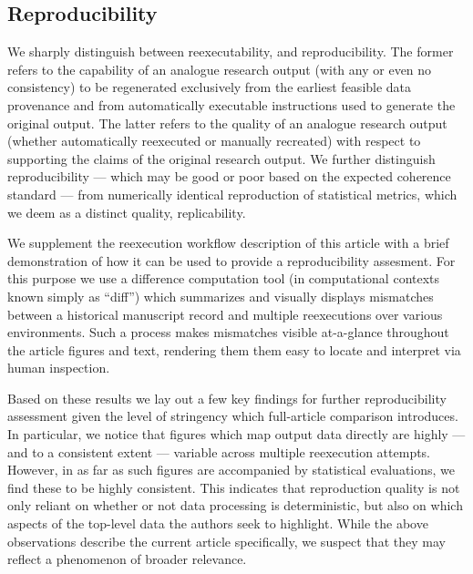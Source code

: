 \subsection{Reproducibility}

We sharply distinguish between reexecutability, and reproducibility.
The former refers to the capability of an analogue research output (with any or even no consistency) to be regenerated exclusively from the earliest feasible data provenance and from automatically executable instructions used to generate the original output.
The latter refers to the quality of an analogue research output (whether automatically reexecuted or manually recreated) with respect to supporting the claims of the original research output.
We further distinguish reproducibility — which may be good or poor based on the expected coherence standard — from numerically identical reproduction of statistical metrics, which we deem as a distinct quality, replicability.

We supplement the reexecution workflow description of this article with a brief demonstration of how it can be used to provide a reproducibility assesment.
For this purpose we use a difference computation tool (in computational contexts known simply as “diff”) which summarizes and visually displays mismatches between a historical manuscript record and multiple reexecutions over various environments.
Such a process makes mismatches visible at-a-glance throughout the article figures and text, rendering them them easy to locate and interpret via human inspection.

Based on these results we lay out a few key findings for further reproducibility assessment given the level of stringency which full-article comparison introduces.
In particular, we notice that figures which map output data directly are highly — and to a consistent extent — variable across multiple reexecution attempts.
However, in as far as such figures are accompanied by statistical evaluations, we find these to be highly consistent.
This indicates that reproduction quality is not only reliant on whether or not data processing is deterministic, but also on which aspects of the top-level data the authors seek to highlight.
While the above observations describe the current article specifically, we suspect that they may reflect a phenomenon of broader relevance.

